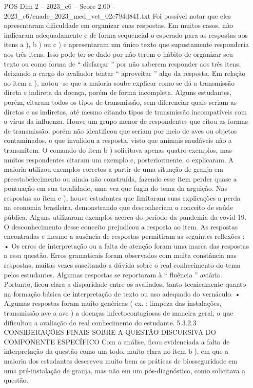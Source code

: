 \begin{textsample}{POS Dim 2 – 2023\_c6 – Score 2.00 – 2023\_c6/enade\_2023\_med\_vet\_02c794d841.txt}
Foi possível notar que eles apresentaram dificuldade em organizar suas respostas.
Em muitos casos, não indicaram adequadamente e de forma sequencial o esperado para as respostas aos itens a ), b ) ou c ) e apresentaram um único texto que supostamente responderia aos três itens.
Isso pode ter se dado por não terem o hábito de organizar seu texto ou como forma de “ disfarçar ” por não saberem responder aos três itens, deixando a cargo do avaliador tentar “ aproveitar ” algo da resposta.
Em relação ao item a ), notou -se que a maioria soube explicar como se dá a transmissão direta e indireta da doença, porém de forma incompleta.
Alguns estudantes, porém, citaram todos os tipos de transmissão, sem diferenciar quais seriam as diretas e as indiretas, até mesmo citando tipos de transmissão incompatíveis com o vírus da influenza.
Houve um grupo menor de respondentes que citou as formas de transmissão, porém não identificou que seriam por meio de aves ou objetos contaminados, o que invalidou a resposta, visto que animais saudáveis não a transmitem.
O comando do item b ) solicitava apenas quatro exemplos, mas muitos respondentes citaram um exemplo e, posteriormente, o explicaram.
A maioria utilizou exemplos corretos a partir de uma situação de granja em preestabelecimento ou ainda não construída, fazendo esse item perder quase a pontuação em sua totalidade, uma vez que fugia do tema da arguição.
Nas respostas ao item c ), houve estudantes que limitaram suas explicações a perda na economia brasileira, demonstrando que desconheciam o conceito de saúde pública.
Alguns utilizaram exemplos acerca do período da pandemia da covid-19.
O desconhecimento desse conceito prejudicou a resposta ao item.
As respostas encontradas e mesmo a ausência de respostas permitiram as seguintes reflexões : • Os erros de interpretação ou a falta de atenção foram uma marca das respostas a essa questão.
Erros gramaticais foram observados com muita constância nas respostas, muitas vezes suscitando a dúvida sobre o real conhecimento do tema pelos estudantes.
Algumas respostas se reportaram à “ fluência ” aviária.
Portanto, ficou clara a disparidade entre os avaliados, tanto tecnicamente quanto na formação básica de interpretação de texto ou uso adequado do vernáculo. • Algumas respostas foram muito genéricas ( ex. : limpeza das instalações, transmissão ave a ave ) a doenças infectocontagiosas de maneira geral, o que dificultou a avaliação do real conhecimento do estudante. 5.3.2.3 CONSIDERAÇÕES FINAIS SOBRE A QUESTÃO DISCURSIVA DO COMPONENTE ESPECÍFICO Com a análise, ficou evidenciada a falta de interpretação da questão como um todo, muito clara no item b ), em que a maioria dos estudantes descreveu muito bem as práticas de biosseguridade em uma pré-instalação de granja, mas não em um pós-diagnóstico, como solicitava a questão.

\end{textsample}
